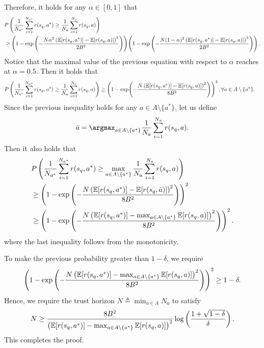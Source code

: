 \begin{myproof}
Therefore, it holds for any $\alpha \in [0, 1]$ that 
\begin{align}
    &P \left( \frac{1}{N_{a^*}}  \sum_{i=1}^{N_{a^*}} r(s_q, a^*) \geq \frac{1}{N_{a}} \sum_{i=1}^{N_{a}}  r(s_q, a) \right) \nonumber \\
    &\geq \left( 1 - \exp \left( - \frac{N \alpha^2 \left({\mathbb E}[r(s_q, a^*)] - {\mathbb E}[r(s_q, a)] \right)^2}{2B^2} \right) \right) \!\! \cdot \!\! \left( 1 - \exp \left( - \frac{N (1-\alpha)^2 \left({\mathbb E}[r(s_q, a^*)] - {\mathbb E}[r(s_q, a)] \right)^2}{2B^2} \right) \right). 
\end{align}
%
Notice that the maximal value of the previous equation with respect to $\alpha$ reaches at $\alpha = 0.5$. Then it holds that
\begin{align}
    & P \left( \frac{1}{N_{a^*}}  \sum_{i=1}^{N_{a^*}} r(s_q, a^*) \geq \frac{1}{N_{a}} \sum_{i=1}^{N_{a}}  r(s_q, a) \right)  \geq  \left( 1 - \exp \! \left( - \frac{N \left({\mathbb E}[r(s_q, a^*)] - {\mathbb E}[r(s_q, a)] \right)^2}{8 B^2} \right) \right)^2, \forall a \in A \setminus \{a^*\}.
\end{align}
%
Since the previous inequality holds for any $a \in A \setminus \{a^*\}$, let us define 
\begin{align}
    \bar{a} = \argmax_{a \in A \setminus \{a^*\}} \frac{1}{N_{a}} \sum_{i=1}^{N_{a}}  r(s_q, a).
\end{align}
%
Then it also holds that
\begin{align}
    & P \left( \frac{1}{N_{a^*}}  \sum_{i=1}^{N_{a^*}} r(s_q, a^*) \geq \max_{a \in A \setminus \{a^*\}} \frac{1}{N_{a}} \sum_{i=1}^{N_{a}}  r(s_q, a) \right) \nonumber \\ 
    &\geq \left( 1 - \exp \left( - \frac{N \left({\mathbb E}[r(s_q, a^*)] - {\mathbb E}[r(s_q, \bar{a})] \right)^2}{8 B^2} \right) \right)^2 \\
    &\geq \left( 1 - \exp \left( - \frac{N \left({\mathbb E}[r(s_q, a^*)] - \max_{a \in A \setminus \{a^*\}} {\mathbb E}[r(s_q, a)] \right)^2}{8 B^2} \right) \right)^2.
\end{align}
where the last inequality follows from the monotonicity.

To make the previous probability greater than $1-\delta$, we require
\begin{align}
    \left( 1 - \exp \left( - \frac{N \left({\mathbb E}[r(s_q, a^*)] - \max_{a \in A \setminus \{a^*\}} {\mathbb E}[r(s_q, a)] \right)^2}{8 B^2} \right) \right)^2 \geq 1-\delta.
\end{align}
%
Hence, we require the trust horizon $N\triangleq \min_{a \in A}  N_a$ to satisfy
\begin{align}
    N \geq \frac{8B^2}{\left({\mathbb E}[r(s_q, a^*)] - \max_{a \in A \setminus \{a^*\}} {\mathbb E}[r(s_q, a)] \right)^2} \log \left( \frac{1+\sqrt{1-\delta}}{\delta} \right).
\end{align}
%
This completes the proof.

\end{myproof}










